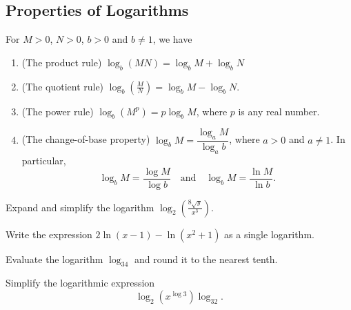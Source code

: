 \hypertarget{properties-of-logarithms}{%
\subsection{Properties of Logarithms}\label{properties-of-logarithms}}

For \(M>0\), \(N>0\), \(b>0\) and \(b\neq 1\), we have

\begin{enumerate}[sepno]
\item
  (The product rule) \(\log_b(MN)=\log_bM+\log_bN\)
\item
  (The quotient rule) \(\log_b(\frac MN)=\log_bM-\log_bN\).
\item
  (The power rule) \(\log_b(M^p)=p\log_bM\), where \(p\) is any real
  number.
\item
  (The change-of-base property) \(\log_bM=\dfrac{\log_aM}{\log_ab}\),
  where \(a>0\) and \(a\neq 1\). In particular, \[
   \log_bM=\dfrac{\log M}{\log b} \quad\text{and}\quad \log_bM=\dfrac{\ln M}{\ln b}.
   \]
\end{enumerate}

\begin{example}

Expand and simplify the logarithm
\(\log_2\left(\frac{8\sqrt{y}}{x^3}\right)\).

\end{example}
\vspace*{6\baselineskip}

\begin{example}

Write the expression \(2\ln(x-1)-\ln(x^2+1)\) as a single logarithm.

\end{example}
\vspace*{6\baselineskip}

\begin{example}

Evaluate the logarithm \(\log_34\) and round it to the nearest tenth.

\end{example}
\vspace*{6\baselineskip}

\begin{example}

Simplify the logarithmic expression \[
\log_2(x^{\log 3})\log_32.
\]

\end{example}
\vspace*{6\baselineskip}

